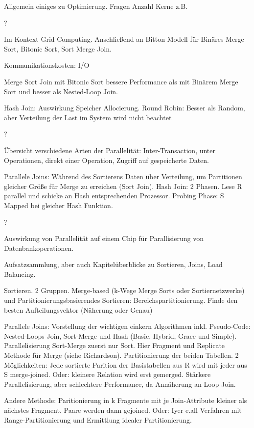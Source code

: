 \documentclass[a4paper,12pt,twoside]{article}
\begin{document}
Allgemein einiges zu Optimierung. Fragen Anzahl Kerne z.B.

\textbf{} ?

Im Kontext Grid-Computing. Anschließend an Bitton Modell für Binäres Merge-Sort, Bitonic Sort, Sort Merge Join.

Kommunikationskosten: I/O

Merge Sort Join mit Bitonic Sort bessere Performance als mit Binärem Merge Sort und besser als Nested-Loop Join.

Hash Join: Auswirkung Speicher Allocierung. Round Robin: Besser als Random, aber Verteilung der Last im System wird nicht beachtet

\textbf{} ?

Übersicht verschiedene Arten der Parallelität: Inter-Transaction, unter Operationen, direkt einer Operation, Zugriff auf gespeicherte Daten.

Parallele Joins: Während des Sortierens Daten über Verteilung, um Partitionen gleicher Größe für Merge zu erreichen (Sort Join). Hash Join: 2 Phasen. Lese R parallel und schicke an Hash entsprechenden Prozessor. Probing Phase: S Mapped bei gleicher Hash Funktion.

\textbf{} ?

Auswirkung von Parallelität auf einem Chip für Parallisierung von Datenbankoperationen. 

\textbf{}

Aufsatzsammlung, aber auch Kapitelüberblicke zu Sortieren, Joins, Load Balancing.

Sortieren. 2 Gruppen. Merge-based (k-Wege Merge Sorts oder Sortiernetzwerke) und Partitionierungsbasierendes Sortieren: Bereichspartitionierung. Finde den besten Aufteilungsvektor (Näherung oder Genau)

Parallele Joins: Vorstellung der wichtigen einkern Algorithmen inkl. Pseudo-Code: Nested-Loops Join, Sort-Merge und Hash (Basic, Hybrid, Grace und Simple). Parallelisierung Sort-Merge zuerst nur Sort. Hier Fragment und Replicate Methode für Merge (siehe Richardson). Partitionierung der beiden Tabellen. 2 Möglichkeiten: Jede sortierte Parition der Basistabellen aus R wird mit jeder aus S merge-joined. Oder: kleinere Relation wird erst gemerged. Stärkere Parallelisierung, aber schlechtere Performance, da Annäherung an Loop Join.

Andere Methode: Paritionierung in k Fragmente mit je Join-Attribute kleiner als nächstes Fragment. Paare werden dann gejoined. Oder: Iyer e.all Verfahren mit Range-Partitionierung und Ermittlung idealer Partitionierung.
\end{document}
